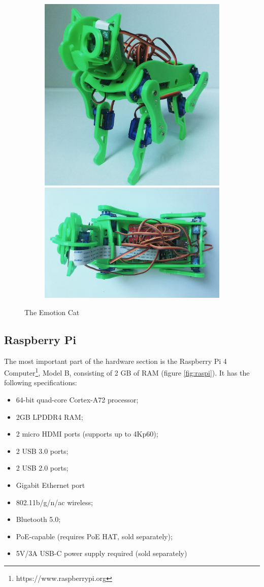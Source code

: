 \documentclass[runningheads,a4paper,12pt]{report}
\begin{document}
\begin{figure}
  \begin{subfigure}{\linewidth}
  \includegraphics[width=.35\linewidth]{./images/cat_up_izometric}\hfill
  \includegraphics[width=.60\linewidth]{./images/cat_from_above}
  \end{subfigure}
    
    \caption{The Emotion Cat}  
    \label{fig:hardware-cat}
\end{figure} 

\subsection*{Raspberry Pi}
The most important part of the hardware section is the Raspberry Pi 4 Computer\footnote{https://www.raspberrypi.org}, Model B, consisting of 2 GB of RAM (figure \ref{fig:raspi}). It has the following specifications:
\begin{multicols}{2}
\begin{itemize}
\item 64-bit quad-core Cortex-A72 processor;
\item 2GB LPDDR4 RAM;
\item 2 micro HDMI ports (supports up to 4Kp60);
\item 2 USB 3.0 ports;
\item 2 USB 2.0 ports;
\item Gigabit Ethernet port
\item 802.11b/g/n/ac wireless;
\item Bluetooth 5.0;
\item PoE-capable (requires PoE HAT, sold separately);
\item 5V/3A USB-C power supply required (sold separately)
\end{itemize}
\end{multicols}
\end{document}
